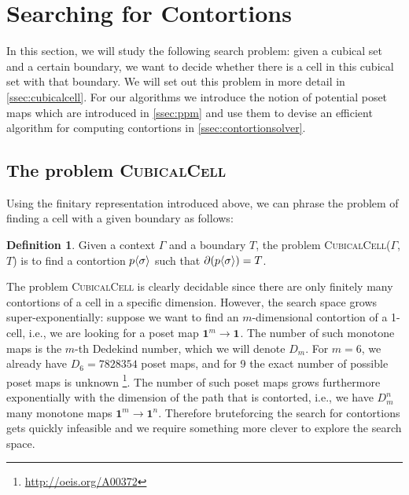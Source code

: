 \documentclass[11pt]{article}
\theoremstyle{definition}
\newtheorem{definition}{Definition}
\newcommand{\problem}[1]{\textsc{{#1}}}
\newcommand{\pint}[1]{\mathbf{1}^{#1}}
\renewcommand{\dim}[1]{\mathsf{dim}({#1})}
\newcommand{\cont}[2]{\ensuremath{ \ifthenelse{\equal{#2}{}}{#1}{{#1}\langle{#2}\rangle}} }
\newcommand{\boundary}[1]{\partial({#1})}
\begin{document}
\section{Searching for Contortions}
\label{sec:contortionsolver}

In this section, we will study the following search problem: given a cubical set
and a certain boundary, we want to decide whether there is a cell in this
cubical set with that boundary. We will set out this problem in more detail in
\autoref{ssec:cubicalcell}. For our algorithms we introduce the notion of
potential poset maps which are introduced in \autoref{ssec:ppm} and use them to
devise an efficient algorithm for computing contortions in
\autoref{ssec:contortionsolver}. 


\subsection{The problem \problem{CubicalCell}}
\label{ssec:cubicalcell}

Using the finitary representation introduced above, we can phrase the problem of
finding a cell with a given boundary as follows:

\begin{definition}
  Given a context $\Gamma$ and a boundary $T$, the problem
  \problem{CubicalCell}($\Gamma$,$T$) is to find a contortion $\cont{p}{\sigma}$ such that
  $\boundary{\cont{p}{\sigma}} = T$.
\end{definition}

The problem \problem{CubicalCell} is clearly decidable since there are
only finitely many contortions of a cell in a specific dimension. However, the
search space grows super-exponentially: suppose we want to find an
$m$-dimensional contortion of a 1-cell, i.e., we are looking for a poset map
$\pint{m} \to \pint{}$. The number of such monotone maps is the $m$-th Dedekind
number, which we will denote $D_m$. For $m = 6$, we already have $D_6 = 7828354$
poset maps, and for 9 the exact number of possible poset maps is unknown
\footnote{\url{http://oeis.org/A00372}}. The number of such poset maps grows
furthermore exponentially with the dimension of the path that is contorted,
i.e., we have $D_m^n$ many monotone maps $\pint{m} \to \pint{n}$. 
Therefore bruteforcing the search for contortions gets quickly infeasible and we
require something more clever to explore the search space.

\end{document}
